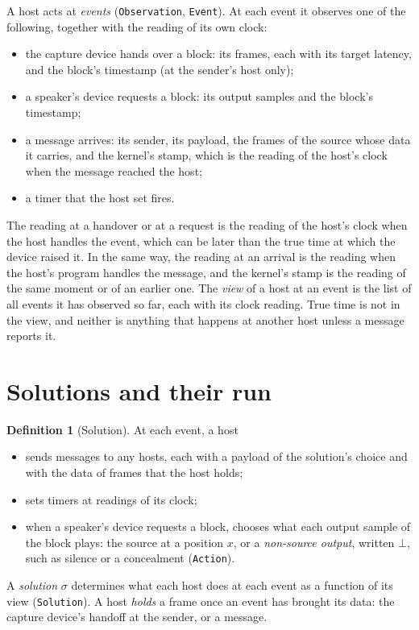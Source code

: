 \documentclass[11pt,a4paper]{article}
\newcommand{\lean}[1]{\texttt{#1}}
\newcommand{\none}{\bot}
\theoremstyle{definition}
\newtheorem{definition}{Definition}[section]
\begin{document}
A host acts at \emph{events} (\lean{Observation}, \lean{Event}). At each
event it observes one of the following, together with the reading of its
own clock:
\begin{itemize}
\item the capture device hands over a block: its frames, each with its
  target latency, and the block's timestamp (at the sender's host only);
\item a speaker's device requests a block: its output samples and the
  block's timestamp;
\item a message arrives: its sender, its payload, the frames of the
  source whose data it carries, and the kernel's stamp, which is the
  reading of the host's clock when the message reached the host;
\item a timer that the host set fires.
\end{itemize}
The reading at a handover or at a request is the reading of the host's
clock when the host handles the event, which can be later than the true
time at which the device raised it. In the same way, the reading at an
arrival is the reading when the host's program handles the message, and
the kernel's stamp is the reading of the same moment or of an earlier one.
The \emph{view} of a host at an event is the list of all events it has
observed so far, each with its clock reading. True time is not in the view,
and neither is anything that happens at another host unless a message
reports it.

\section{Solutions and their run}\label{sec:solutions}

\begin{definition}[Solution]
At each event, a host
\begin{itemize}
\item sends messages to any hosts, each with a payload of the solution's
  choice and with the data of frames that the host holds;
\item sets timers at readings of its clock;
\item when a speaker's device requests a block, chooses what each output
  sample of the block plays: the source at a position $x$, or a
  \emph{non-source output}, written $\none$, such as silence or a
  concealment (\lean{Action}).
\end{itemize}
A \emph{solution} $\sigma$ determines what each host does at each event as a
function of its view (\lean{Solution}). A host \emph{holds} a frame once an
event has brought its data: the capture device's handoff at the sender, or
a message.
\end{definition}
\end{document}
